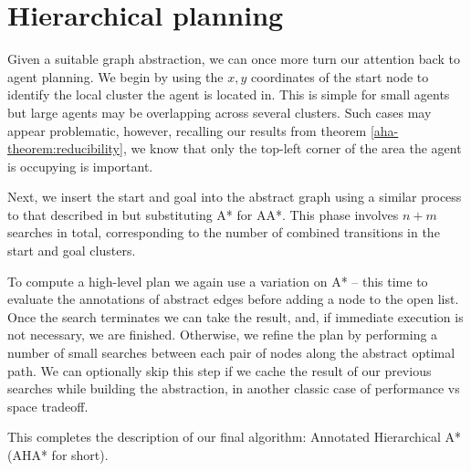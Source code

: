 \section{Hierarchical planning}
Given a suitable graph abstraction, we can once more turn our attention back to agent planning. 
We begin by using the $x,y$ coordinates of the start node to identify the local cluster the agent is located in. This is simple for small agents but large agents may be overlapping across several clusters. Such cases may appear problematic, however, recalling our results from theorem \ref{aha-theorem:reducibility}, we know that only the top-left corner of the area the agent is occupying is important.
\par \indent
Next, we insert the start and goal into the abstract graph using a similar process to that described in \cite{botea04} but substituting A* for AA*. This phase involves $n+m$ searches in total, corresponding to the number of combined transitions in the start and goal clusters.
\par \indent
To compute a high-level plan we again use a variation on A* -- this time to evaluate the annotations of abstract edges before adding a node to the open list.
Once the search terminates we can take the result, and, if immediate execution is not necessary, we are finished. 
Otherwise, we refine the plan by performing a number of small searches between each pair of nodes along the abstract optimal path. 
We can optionally skip this step if we cache the result of our previous searches while building the abstraction, in another classic case of performance vs space tradeoff. 
\par \indent
This completes the description of our final algorithm: Annotated Hierarchical A* (AHA* for short).

